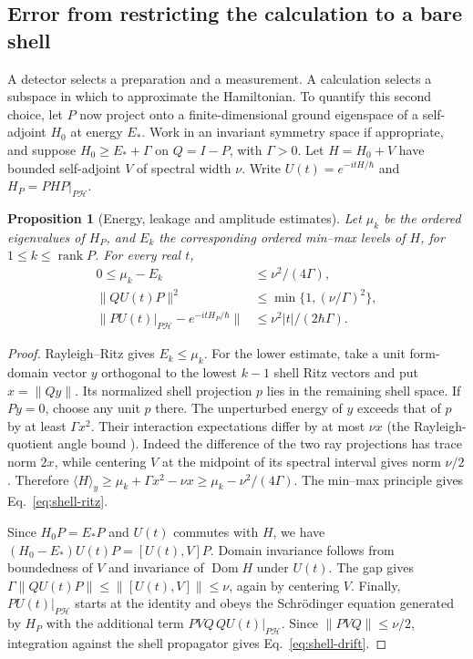 \documentclass[11pt]{article}
\newtheorem{proposition}{Proposition}[section]
\theoremstyle{definition}
\DeclareMathOperator{\rank}{rank}
\begin{document}
\subsection{Error from restricting the calculation to a bare shell}

A detector selects a preparation and a measurement. A calculation selects a subspace in which to approximate the Hamiltonian. To quantify this second choice, let $P$ now project onto a finite-dimensional ground eigenspace of a self-adjoint $H_0$ at energy $E_*$. Work in an invariant symmetry space if appropriate, and suppose $H_0\ge E_*+\Gamma$ on $Q=I-P$, with $\Gamma>0$. Let $H=H_0+V$ have bounded self-adjoint $V$ of spectral width $\nu$. Write $U(t)=e^{-itH/\hbar}$ and $H_P=PHP|_{P\mathcal H}$.

\begin{proposition}[Energy, leakage and amplitude estimates]
\label{prop:shell-accuracy}
Let $\mu_k$ be the ordered eigenvalues of $H_P$, and $E_k$ the corresponding ordered min--max levels of $H$, for $1\le k\le\rank P$. For every real $t$,
\begin{align}
 0\le \mu_k-E_k &\le \nu^2/(4\Gamma), \label{eq:shell-ritz}\\
 \|QU(t)P\|^2 &\le \min\{1,(\nu/\Gamma)^2\}, \label{eq:shell-leak}\\
 \big\|PU(t)|_{P\mathcal H}-e^{-itH_P/\hbar}\big\|
 &\le \nu^2 |t|/(2\hbar\Gamma). \label{eq:shell-drift}
\end{align}
\end{proposition}

\begin{proof}
Rayleigh--Ritz gives $E_k\le\mu_k$. For the lower estimate, take a unit form-domain vector $y$ orthogonal to the lowest $k-1$ shell Ritz vectors and put $x=\|Qy\|$. Its normalized shell projection $p$ lies in the remaining shell space. If $Py=0$, choose any unit $p$ there. The unperturbed energy of $y$ exceeds that of $p$ by at least $\Gamma x^2$. Their interaction expectations differ by at most $\nu x$ (the Rayleigh-quotient angle bound \cite{ZhuArgentatiKnyazev}). Indeed the difference of the two ray projections has trace norm $2x$, while centering $V$ at the midpoint of its spectral interval gives norm $\nu/2$. Therefore $\langle H\rangle_y\ge\mu_k+\Gamma x^2-\nu x\ge\mu_k-\nu^2/(4\Gamma)$. The min--max principle gives Eq.~\eqref{eq:shell-ritz}.

Since $H_0P=E_*P$ and $U(t)$ commutes with $H$, we have $(H_0-E_*)U(t)P=[U(t),V]P$. Domain invariance follows from boundedness of $V$ and invariance of $\operatorname{Dom}H$ under $U(t)$. The gap gives $\Gamma\|QU(t)P\|\le\|[U(t),V]\|\le\nu$, again by centering $V$. Finally, $PU(t)|_{P\mathcal H}$ starts at the identity and obeys the Schr\"odinger equation generated by $H_P$ with the additional term $PVQ\,QU(t)|_{P\mathcal H}$. Since $\|PVQ\|\le\nu/2$, integration against the shell propagator gives Eq.~\eqref{eq:shell-drift}.
\end{proof}
\end{document}
